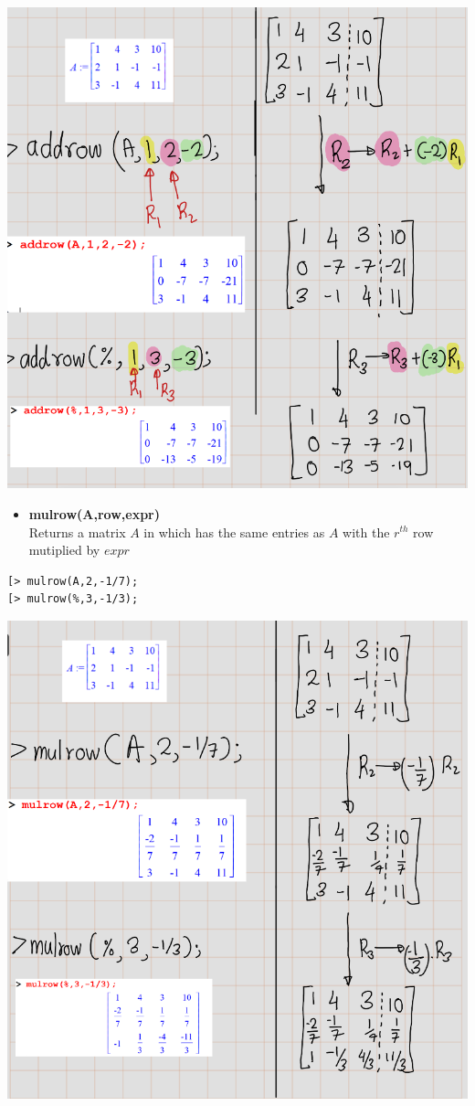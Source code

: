 \documentclass[
]{book}
\providecommand{\tightlist}{%
  \setlength{\itemsep}{0pt}\setlength{\parskip}{0pt}}
\theoremstyle{definition}
\theoremstyle{definition}
\theoremstyle{definition}
\theoremstyle{definition}
\theoremstyle{remark}
\begin{document}
\includegraphics{figures/Lesson 4/fig9.png}

\begin{itemize}
\tightlist
\item
  \textbf{mulrow(A,row,expr)}\\
  Returns a matrix \(A\) in which has the same entries as \(A\) with the \(r^{th}\) row mutiplied by \(expr\)
\end{itemize}

\begin{verbatim}
[> mulrow(A,2,-1/7);
[> mulrow(%,3,-1/3);
\end{verbatim}

\includegraphics{figures/Lesson 4/fig10.png}
\end{document}
